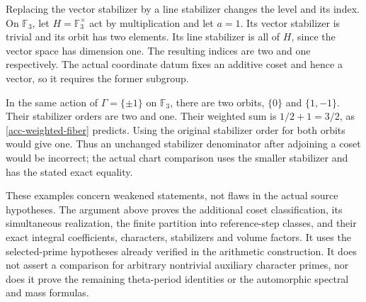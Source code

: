 \begin{example}\label{acc-line-counterexample}
Replacing the vector stabilizer by a line stabilizer changes the
level and its index.  On $\mathbb F_3$, let
$H=\mathbb F_3^\times$ act by multiplication and let $a=1$.
Its vector stabilizer is trivial and its orbit has two elements.
Its line stabilizer is all of $H$, since the vector space has
dimension one.  The resulting indices are two and one respectively.
The actual coordinate datum fixes an additive coset and hence a
vector, so it requires the former subgroup.
\end{example}

\begin{example}\label{acc-weight-counterexample}
In the same action of $\Gamma=\{\pm1\}$ on $\mathbb F_3$,
there are two orbits, $\{0\}$ and $\{1,-1\}$.
Their stabilizer orders are two and one.  Their weighted sum is
$1/2+1=3/2$, as \eqref{acc-weighted-fiber} predicts.
Using the original stabilizer order for both orbits would give one.
Thus an unchanged stabilizer denominator after adjoining a coset
would be incorrect; the actual chart comparison uses the smaller
stabilizer and has the stated exact equality.
\end{example}

These examples concern weakened statements, not flaws in the
actual source hypotheses.  The argument above proves the additional
coset classification, its simultaneous realization, the finite
partition into reference-step classes, and their exact integral
coefficients, characters, stabilizers and volume factors.
It uses the selected-prime hypotheses already verified in the
arithmetic construction.  It does not assert a comparison for
arbitrary nontrivial auxiliary character primes, nor does it prove
the remaining theta-period identities or the automorphic spectral
and mass formulas.


